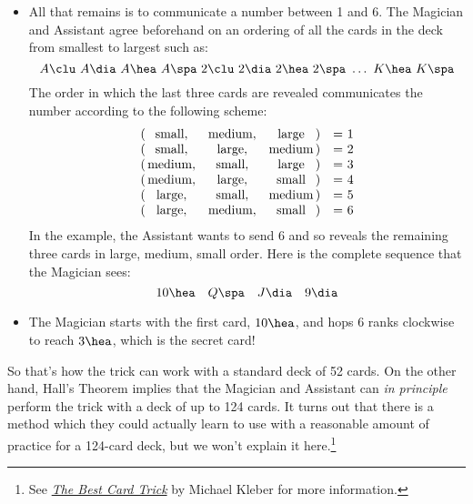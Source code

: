 \begin{itemize}
\begin{itemize}
\end{itemize}

\item All that remains is to communicate a number between 1 and 6.
The Magician and Assistant agree beforehand on an ordering of all the
cards in the deck from smallest to largest such as:
%
\[
A \clu\  A \dia\  A \hea\ A \spa\
2 \clu\  2 \dia\  2 \hea\ 2 \spa\
\dots\ K \hea\ K \spa
\]
%
The order in which the last three cards are revealed communicates the
number according to the following scheme:
%
\[
\begin{array}{r@{\,}ccc@{\,}ll}
(&\text{small},&\text{medium},&\text{large}&) & ${}= 1$ \\
(&\text{small},&\text{large},&\text{medium}&) & ${}= 2$ \\
(&\text{medium},&\text{small},&\text{large}&) & ${}= 3$ \\
(&\text{medium},&\text{large},&\text{small}&) & ${}= 4$ \\
(&\text{large},&\text{small},&\text{medium}&) & ${}= 5$ \\
(&\text{large},&\text{medium},&\text{small}&) & ${}= 6$
\end{array}
\]
%
In the example, the Assistant wants to send 6 and so reveals the
remaining three cards in large, medium, small order.  Here is the
complete sequence that the Magician sees:
%
\[
10 \hea \quad Q \spa \quad J \dia \quad 9 \dia
\]

\item The Magician starts with the first card, $10 \hea$, and hops 6
ranks clockwise to reach $3 \hea$, which is the secret card!

\end{itemize}

So that's how the trick can work with a standard deck of 52 cards.  On
the other hand, Hall's Theorem implies that the Magician and Assistant
can \emph{in principle} perform the trick with a deck of up to 124
cards.  It turns out that there is a method which they could actually
learn to use with a reasonable amount of practice for a 124-card deck,
but we won't explain it here.\footnote{See
  \href{http://courses.csail.mit.edu/6.042/spring11/Kleber-cardTrick.pdf}{\emph{The
      Best Card Trick}} by Michael Kleber for more information.}

\iffalse
Also, \emph{Using a Card Trick to Teach Discrete Mathematics}, Simonson,
Shai, Holm, Tara S., Primus: Problems, Resources, and Issues in
Mathematics Undergraduate Studies, Sep 2003.
\fi


